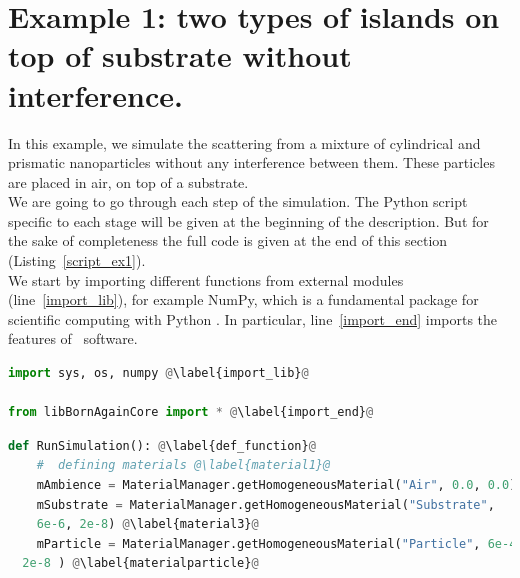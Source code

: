 %



\section{Example 1: two types of islands on top of
  substrate without interference.} 


In this example, we simulate the scattering from a mixture of
cylindrical and prismatic nanoparticles without any interference
between them. These particles are placed in air, on top
of a substrate.\\ We are going to go through each step of the
simulation. The Python script specific to each stage will be given at
the beginning of the description. But for the sake of completeness the full code is given
at the end of this section (Listing~\ref{script_ex1}). \\

\noindent We start by importing different functions from external
modules (line~\ref{import_lib}), for example NumPy, which
is a fundamental package for scientific computing with Python \cite{s:numpy}.  In particular, line~\ref{import_end}
imports the features of \BornAgain\ software.\\

\begin{lstlisting}[language=python, style=eclipseboxed,name=ex1,nolol]
import sys, os, numpy @\label{import_lib}@

from libBornAgainCore import * @\label{import_end}@
\end{lstlisting}


 

\begin{lstlisting}[language=python, style=eclipseboxed,name=ex1,nolol]
def RunSimulation(): @\label{def_function}@
    #  defining materials @\label{material1}@
    mAmbience = MaterialManager.getHomogeneousMaterial("Air", 0.0, 0.0)  @\label{material2}@
    mSubstrate = MaterialManager.getHomogeneousMaterial("Substrate",
    6e-6, 2e-8) @\label{material3}@
    mParticle = MaterialManager.getHomogeneousMaterial("Particle", 6e-4,
  2e-8 ) @\label{materialparticle}@
\end{lstlisting}

